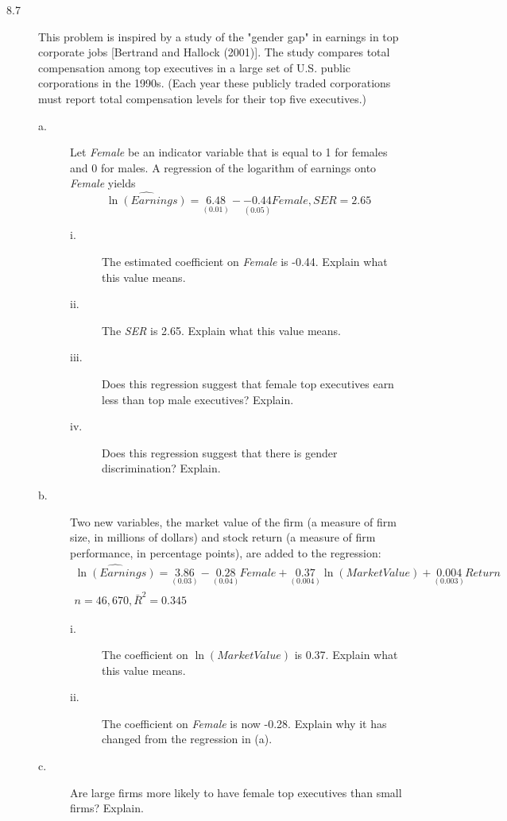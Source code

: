 \documentclass[a4paper,11pt]{article}
\begin{document}
\begin{description}
\item[{8.7}] This problem is inspired by a study of the "gender gap" in
earnings in top corporate jobs [Bertrand and Hallock
(2001)]. The study compares total compensation among top
executives in a large set of U.S. public corporations in the
1990s. (Each year these publicly traded corporations must
report total compensation levels for their top five
executives.)
\begin{description}
\item[{a.}] Let \emph{Female} be an indicator variable that is equal to 1 for
females and 0 for males. A regression of the logarithm of
earnings onto \emph{Female} yields
\[ \widehat{\ln(Earnings)} = \underset{(0.01)}{6.48} -
          \underset{(0.05)}{-0.44}Female, SER = 2.65 \]
\begin{description}
\item[{i.}] The estimated coefficient on \emph{Female} is -0.44. Explain
what this value means.
\item[{ii.}] The \emph{SER} is 2.65. Explain what this value means.
\item[{iii.}] Does this regression suggest that female top executives
earn less than top male executives? Explain.
\item[{iv.}] Does this regression suggest that there is gender
discrimination? Explain.
\end{description}
\item[{b.}] Two new variables, the market value of the firm (a measure
of firm size, in millions of dollars) and stock return (a
measure of firm performance, in percentage points), are
added to the regression:
\begin{gather*}
\widehat{\ln(Earnings)} = \underset{\displaystyle (0.03)}{3.86} -
\underset{\displaystyle (0.04)}{0.28}Female +
\underset{\displaystyle (0.004)}{0.37}\ln(MarketValue)
+ \underset{\displaystyle (0.003)}{0.004}Return \\
n = 46,670, \bar{R}^2 = 0.345
\end{gather*}
\begin{description}
\item[{i.}] The coefficient on \(\ln(MarketValue)\) is 0.37. Explain
what this value means.
\item[{ii.}] The coefficient on \emph{Female} is now -0.28. Explain why
it has changed from the regression in (a).
\end{description}
\item[{c.}] Are large firms more likely to have female top executives
than small firms? Explain.
\end{description}


\end{description}
\end{document}
